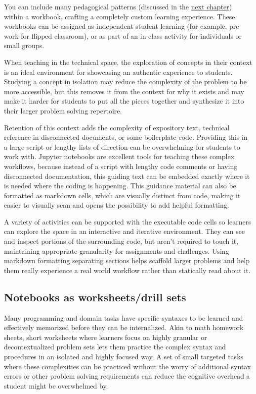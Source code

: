 \documentclass[]{book}
\begin{document}
You can include many pedagogical patterns (discussed in the \protect\hyperlink{catalogue}{next chapter}) within
a workbook, crafting a completely custom learning experience. These workbooks
can be assigned as independent student learning (for example, pre-work for
flipped classroom), or as part of an in class activity for individuals or small
groups.

When teaching in the technical space, the exploration of concepts in their
context is an ideal environment for showcasing an authentic experience to
students. Studying a concept in isolation may reduce the complexity of the
problem to be more accessible, but this removes it from the context for why it
exists and may make it harder for students to put all the pieces together and
synthesize it into their larger problem solving repertoire.

Retention of this context adds the complexity of expository text, technical
reference in disconnected documents, or some boilerplate code. Providing this in
a large script or lengthy lists of direction can be overwhelming for students to
work with. Jupyter notebooks are excellent tools for teaching these complex
workflows, because instead of a script with lengthy code comments or having
disconnected documentation, this guiding text can be embedded exactly where it
is needed where the coding is happening. This guidance material can also be
formatted as markdown cells, which are visually distinct from code, making it
easier to visually scan and opens the possibility to add helpful formatting.

A variety of activities can be supported with the executable code cells so
learners can explore the space in an interactive and iterative environment.
They can see and inspect portions of the surrounding code, but aren't required
to touch it, maintaining appropriate granularity for assignments and challenges.
Using markdown formatting separating sections helps scaffold larger problems and
help them really experience a real world workflow rather than statically read
about it.

\hypertarget{notebooks-as-worksheetsdrill-sets}{%
\subsection{Notebooks as worksheets/drill sets}\label{notebooks-as-worksheetsdrill-sets}}

Many programming and domain tasks have specific syntaxes to be learned and
effectively memorized before they can be internalized. Akin to math homework
sheets, short worksheets where learners focus on highly granular or
decontextualized problem sets lets them practice the complex syntax and
procedures in an isolated and highly focused way. A set of small targeted tasks
where these complexities can be practiced without the worry of additional syntax
errors or other problem solving requirements can reduce the cognitive overhead a
student might be overwhelmed by.
\end{document}
